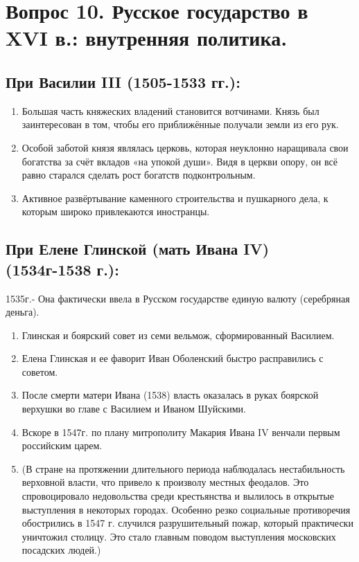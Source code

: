 \section{Вопрос 10. Русское государство в XVI в.: внутренняя политика.}

\subsection{При Василии III (1505-1533 гг.):}

\begin{enumerate}
    \item{ Большая часть княжеских владений становится вотчинами. Князь был заинтересован в том, чтобы его приближённые получали земли из его рук. }
    \item{ Особой заботой князя являлась церковь, которая неуклонно наращивала свои богатства за счёт вкладов «на упокой души». Видя в церкви опору, он всё равно старался сделать рост богатств подконтрольным.}
    \item{ Активное развёртывание каменного строительства и пушкарного дела, к которым широко привлекаются иностранцы.}
\end{enumerate}

\subsection{При Елене Глинской (мать Ивана IV) (1534г-1538 г.):}

1535г.- Она фактически ввела в Русском государстве единую валюту (серебряная деньга).

\begin{enumerate}
    \item{ Глинская и боярский совет из семи вельмож, сформированный Василием. }
    \item{ Елена Глинская и ее фаворит Иван Оболенский быстро расправились с советом. }
    \item{ После смерти матери Ивана (1538) власть оказалась в руках боярской верхушки во главе с Василием и Иваном Шуйскими. }
    \item{ Вскоре в 1547г. по плану митрополиту Макария Ивана IV венчали первым российским царем.}
    \item{ (В стране на протяжении длительного периода наблюдалась нестабильность верховной власти, что привело к произволу местных феодалов. Это спровоцировало недовольства среди крестьянства и вылилось в открытые выступления в некоторых городах. Особенно резко социальные противоречия обострились в 1547 г. случился разрушительный пожар, который практически уничтожил столицу. Это стало главным поводом выступления московских посадских людей.)}
\end{enumerate}

